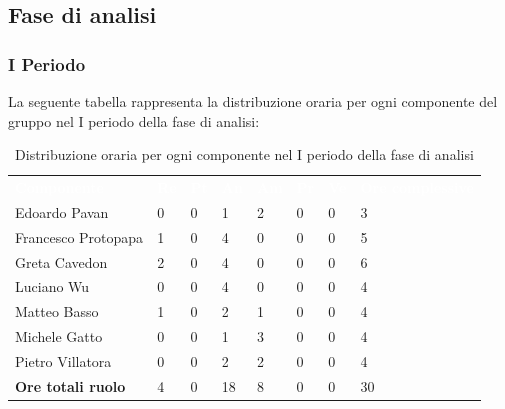 \subsection{Fase di analisi}
\subsubsection{I Periodo}
La seguente tabella rappresenta la distribuzione oraria per ogni componente del gruppo nel I periodo della fase di analisi:
\begin{table}[H]
\begin{center}
\renewcommand{\arraystretch}{1.25}
\begin{tabular}{ m{}<{\centering}  m{}<{\centering} m{}<{\centering} m{}<{\centering}  m{}<{\centering}  m{}<{\centering}  m{}<{\centering}  m{}<{\centering}   }
	\rowcolor{darkblue}
	\textcolor{white}{\textbf{Componente}} &\textcolor{white}{\textbf{Re}}&\textcolor{white}{\textbf{Pt}}&\textcolor{white}{\textbf{An}}&\textcolor{white}{\textbf{Am}}&\textcolor{white}{\textbf{Pr}}&\textcolor{white}{\textbf{Ve}}&\textcolor{white}{\textbf{Ore complessive}}\\ 

	Edoardo Pavan & 0 & 0 & 1 & 2 & 0 & 0 & 3 \\	
	
	Francesco Protopapa & 1 & 0 & 4 & 0 & 0 & 0 & 5 \\

	Greta Cavedon & 2 & 0 & 4 & 0 & 0 & 0 & 6 \\
	
	Luciano Wu & 0 & 0 & 4 & 0 & 0 & 0 & 4\\
	
	Matteo Basso & 1 & 0 & 2 & 1 & 0 & 0 & 4 \\
	
	Michele Gatto &  0 & 0 & 1 & 3 & 0 & 0 & 4\\
	
	Pietro Villatora & 0 & 0 & 2 & 2 & 0 & 0 & 4 \\
	
	\textbf{Ore totali ruolo} & 4 & 0 & 18 & 8 & 0 & 0 & 30\\

\end{tabular}
\caption{Distribuzione oraria per ogni componente nel I periodo della fase di analisi}
\end{center}
\end{table}

